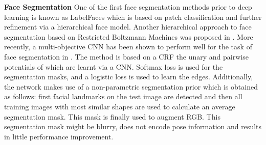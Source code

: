 \textbf{Face Segmentation} One of the first face segmentation methods
prior to deep learning is known as LabelFaces
\cite{warrell2009labelfaces} which is based on patch classification
and further refinement via a hierarchical face model. Another
hierarchical approach to face segmentation based on Restricted
Boltzmann Machines was proposed in \cite{luo2012hierarchical}. More
recently, a multi-objective CNN has been shown to perform well for the
task of face segmentation in \cite{liu2015multi}. The method is based
on a CRF the unary and pairwise potentials of which are learnt via a
CNN. Softmax loss is used for the segmentation masks, and a logistic
loss is used to learn the edges. Additionally, the network makes use
of a non-parametric segmentation prior which is obtained as follows:
first facial landmarks on the test image are detected and then all
training images with most similar shapes are used to calculate an
average segmentation mask. This mask is finally used to augment
RGB. This segmentation mask might be blurry, does not encode pose
information and results in little performance improvement.










